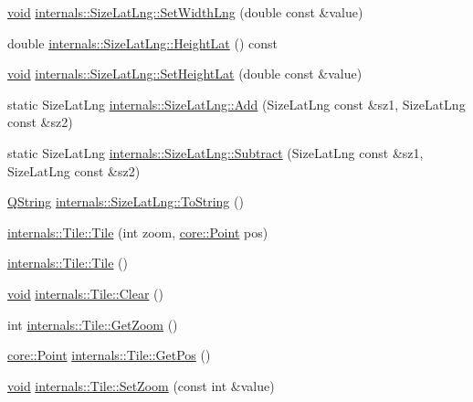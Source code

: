 \begin{DoxyCompactItemize}
\hyperlink{group___u_a_v_objects_plugin_ga444cf2ff3f0ecbe028adce838d373f5c}{void} \hyperlink{group___o_p_map_widget_ga73df3d96826b8dbf86b2676c759d867e}{internals\-::\-Size\-Lat\-Lng\-::\-Set\-Width\-Lng} (double const \&value)
\item 
double \hyperlink{group___o_p_map_widget_ga54840364c05e0258bc30df133bd36107}{internals\-::\-Size\-Lat\-Lng\-::\-Height\-Lat} () const 
\item 
\hyperlink{group___u_a_v_objects_plugin_ga444cf2ff3f0ecbe028adce838d373f5c}{void} \hyperlink{group___o_p_map_widget_gaf25f9fe7c877df23a2cce0194354c001}{internals\-::\-Size\-Lat\-Lng\-::\-Set\-Height\-Lat} (double const \&value)
\item 
static \-Size\-Lat\-Lng \hyperlink{group___o_p_map_widget_gab3c5d8301e62629897221a2d5b2ba0b7}{internals\-::\-Size\-Lat\-Lng\-::\-Add} (\-Size\-Lat\-Lng const \&sz1, \-Size\-Lat\-Lng const \&sz2)
\item 
static \-Size\-Lat\-Lng \hyperlink{group___o_p_map_widget_ga6e437e3b3d5fd023b4afec09ad37928e}{internals\-::\-Size\-Lat\-Lng\-::\-Subtract} (\-Size\-Lat\-Lng const \&sz1, \-Size\-Lat\-Lng const \&sz2)
\item 
\hyperlink{group___u_a_v_objects_plugin_gab9d252f49c333c94a72f97ce3105a32d}{\-Q\-String} \hyperlink{group___o_p_map_widget_ga70356ecffc32e8609752c282f95c7183}{internals\-::\-Size\-Lat\-Lng\-::\-To\-String} ()
\item 
\hyperlink{group___o_p_map_widget_ga60a32de8eb056679d219587b8caf1237}{internals\-::\-Tile\-::\-Tile} (int zoom, \hyperlink{structcore_1_1_point}{core\-::\-Point} pos)
\item 
\hyperlink{group___o_p_map_widget_ga0dbddb1e894ab49cd9965e12002f3969}{internals\-::\-Tile\-::\-Tile} ()
\item 
\hyperlink{group___u_a_v_objects_plugin_ga444cf2ff3f0ecbe028adce838d373f5c}{void} \hyperlink{group___o_p_map_widget_ga827a2b95ce33f4a2dcbb98cd1b94ea65}{internals\-::\-Tile\-::\-Clear} ()
\item 
int \hyperlink{group___o_p_map_widget_ga8f3669a9492cdfacd22026ef7456735d}{internals\-::\-Tile\-::\-Get\-Zoom} ()
\item 
\hyperlink{structcore_1_1_point}{core\-::\-Point} \hyperlink{group___o_p_map_widget_gacdfd78f26efd7d893ba5329145465096}{internals\-::\-Tile\-::\-Get\-Pos} ()
\item 
\hyperlink{group___u_a_v_objects_plugin_ga444cf2ff3f0ecbe028adce838d373f5c}{void} \hyperlink{group___o_p_map_widget_gada2e44d9a3bcfa1e07e8220944335692}{internals\-::\-Tile\-::\-Set\-Zoom} (const int \&value)

\end{DoxyCompactItemize}
